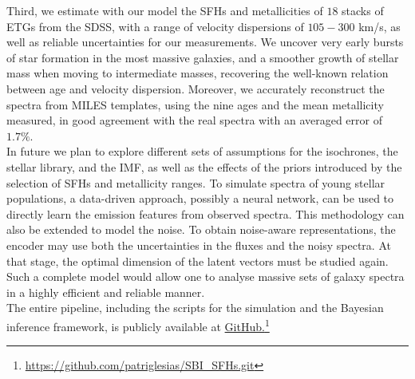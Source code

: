 Third, we estimate with our model the SFHs and metallicities of $18$ stacks of ETGs from the SDSS, with a range of velocity dispersions of $105-300$ km/s,  as well as  reliable uncertainties for our measurements. We uncover very early bursts of star formation in the most massive galaxies, and a smoother growth of stellar mass when moving to intermediate masses, recovering the well-known relation between age and velocity dispersion. Moreover, we accurately reconstruct the spectra from MILES templates, using the nine ages and the mean metallicity measured, in good agreement with the real spectra with an averaged error of $1.7 \%$.\\

In future we plan to explore different sets of assumptions for the isochrones, the stellar library, and the IMF, as well as the effects of the priors introduced by the selection of SFHs and metallicity ranges. To simulate spectra of young stellar populations, a data-driven approach, possibly a neural network, can be used to directly learn the emission features from observed spectra. This methodology can also be extended to model the noise. To obtain noise-aware representations, the encoder may use both the uncertainties in the fluxes and the noisy spectra. At that stage, the optimal dimension of the latent vectors must be studied again. Such a complete model would allow one to analyse massive sets of galaxy spectra in a highly efficient and reliable manner.\\


The entire pipeline, including the scripts for the simulation and the Bayesian inference framework, is publicly available at \href{https://github.com/patriglesias/SBI_SFHs.git}{GitHub.}\footnote{\href{https://github.com/patriglesias/SBI_SFHs.git}{https://github.com/patriglesias/SBI\_SFHs.git}}

